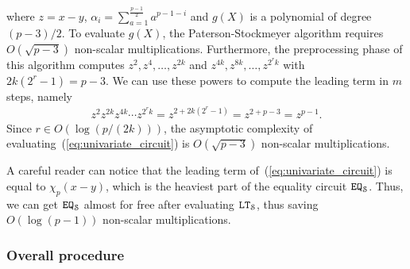   where $z = x - y$, $\alpha_i = \sum_{a=1}^{\frac{p-1}{2}} a^{p-1-i}$ and $g(X)$ is a polynomial of degree $(p-3)/2$.
  To evaluate $g(X)$, the Paterson-Stockmeyer algorithm requires $O(\sqrt{p-3})$ non-scalar multiplications.
  Furthermore, the preprocessing phase of this algorithm computes $z^2, z^4, \dots, z^{2k}$ and $z^{4k}, z^{8k}, \dots, z^{2^r k}$ with $2k(2^r-1) = p-3$.
  We can use these powers to compute the leading term in $m$ steps, namely
  \begin{align*}
    z^2 z^{2k} z^{4k} \cdots z^{2^r k} = z^{2 + 2k(2^r-1)} = z^{2 + p - 3} = z^{p-1}.
  \end{align*}
  Since $r \in O(\log (p/(2k)))$, the asymptotic complexity of evaluating~(\ref{eq:univariate_circuit}) is $O(\sqrt{p-3})$ non-scalar multiplications.
  
  \begin{remark}
    A careful reader can notice that the leading term of~(\ref{eq:univariate_circuit}) is equal to $\chi_p(x-y)$, which is the heaviest part of the equality circuit $\mathtt{EQ}_{\mathcal{S}}$.
    Thus, we can get $\mathtt{EQ}_{\mathcal{S}}$ almost for free after evaluating $\mathtt{LT}_{\mathcal{S}}$, thus saving $O(\log (p-1))$ non-scalar multiplications.
  \end{remark}

\subsubsection{Overall procedure}  


